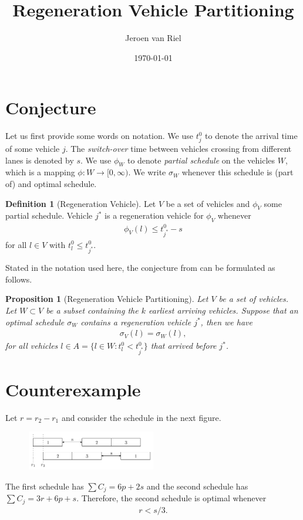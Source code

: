 \documentclass{article}
\title{Regeneration Vehicle Partitioning}
\author{Jeroen van Riel}
\date{\monthyeardate\today}
\theoremstyle{definition}
\newtheorem{define}{Definition}[section]
\theoremstyle{plain}
\newtheorem{proposition}{Proposition}[section]
\begin{document}
\maketitle

\section{Conjecture}

Let us first provide some words on notation. We use $t_{j}^{0}$ to denote the
arrival time of some vehicle $j$. The \textit{switch-over} time between vehicles
crossing from different lanes is denoted by $s$. We use $\phi_{W}$ to denote
\textit{partial schedule} on the vehicles $W$, which is a mapping
$\phi: W \rightarrow [0, \infty)$. We write $\sigma_{W}$ whenever this schedule
is (part of) and optimal schedule.

\begin{define}[Regeneration Vehicle]
  Let $V$ be a set of vehicles and $\phi_{V}$ some partial schedule. Vehicle $j^{*}$
  is a regeneration vehicle for $\phi_{V}$ whenever
  \begin{align}
    \phi_{V}(l) \leq t_{j^{*}}^{0} - s
  \end{align}
  for all $l \in V$ with $t_{l}^{0} \leq t_{j^{*}}^{0}$.
\end{define}

Stated in the notation used here, the conjecture from
\cite{limpensOnlinePlatoonForming2023} can be formulated as follows.

\begin{proposition}[Regeneration Vehicle Partitioning]
  Let $V$ be a set of vehicles. Let $W \subset V$ be a subset containing the $k$ earliest arriving vehicles. Suppose that an optimal schedule $\sigma_{W}$ contains a regeneration vehicle $j^{*}$, then we have
  \begin{align}
    \sigma_{V}(l) = \sigma_{W}(l) ,
   \end{align}
   for all vehicles $l \in A = \{ l \in W : t_{l}^{0} < t_{j^{*}}^{0} \}$ that
   arrived before $j^{*}$.
\end{proposition}

\section{Counterexample}

Let $r = r_{2} - r_{1}$ and consider the schedule in the next figure.
\begin{figure}[h]
  \centering
  \includegraphics[width=0.5\textwidth]{figures/123.pdf}
\end{figure}
The first schedule has $\sum C_{j} = 6p + 2s$ and the second schedule has
$\sum C_{j} = 3r + 6p + s$. Therefore, the second schedule is optimal whenever
\begin{align}
  \label{eq:counter-assump1}
  r < s / 3 .
\end{align}
\end{document}
